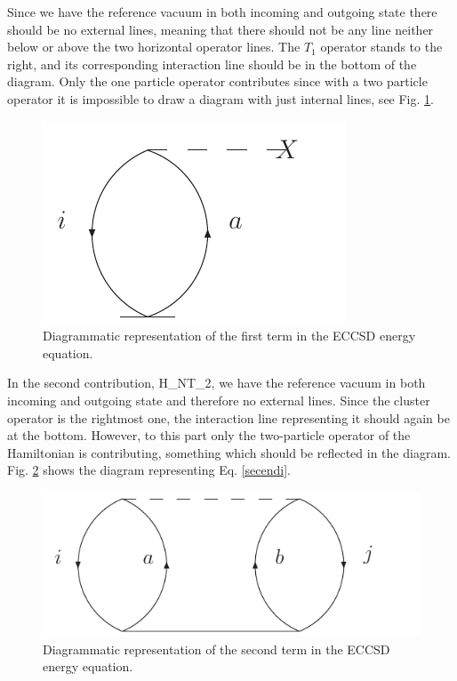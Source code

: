 Since we have the reference vacuum in both incoming and outgoing state there
should be no external lines, meaning that there should not be 
any line neither below or above the two horizontal operator 
lines. The $T_1$ operator stands to the right, and its 
corresponding interaction line should be in the bottom of 
the diagram. Only the one particle operator contributes since with a two 
particle operator it is impossible to draw a diagram with just internal 
lines, see Fig. \ref{firstenedi}. 
\begin{figure}[htp]
\centering
\includegraphics[scale=0.75]{firstenedi}
\caption{Diagrammatic representation of the first term in the 
ECCSD energy equation.}
\label{firstenedi}
\end{figure}
In the second contribution,
\be
{}H_NT_2,
\label{secendi}
\ee
we have the reference vacuum in both incoming and outgoing state and therefore no external lines. Since the 
cluster operator is the rightmost one, the interaction line 
representing it should again be at the bottom. However, to this 
part only the two-particle operator of the Hamiltonian is 
contributing, something which should be reflected in the 
diagram. Fig. \ref{secndi} shows the diagram representing Eq. 
\eqref{secendi}.
\begin{figure}[htp]
\centering
\includegraphics[scale=0.75]{secenedi}
\caption{Diagrammatic representation of the second term in the 
ECCSD energy equation.}
\label{secndi}
\end{figure}
